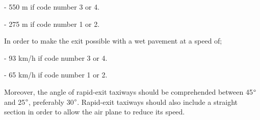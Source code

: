 		-	550 m if code number 3 or 4.
		
		-	275 m if code number 1 or 2.
		
		In order to make the exit possible with a wet pavement at a speed of;
		
		-	93 km/h if code number 3 or 4.
		
		-	65 km/h if code number 1 or 2.
		
		Moreover, the angle of rapid-exit taxiways should be comprehended between 45\(\degree\) and 25\(\degree\), preferably 30\(\degree\). Rapid-exit taxiways should also include a straight section in order to allow the air plane to reduce its speed. 